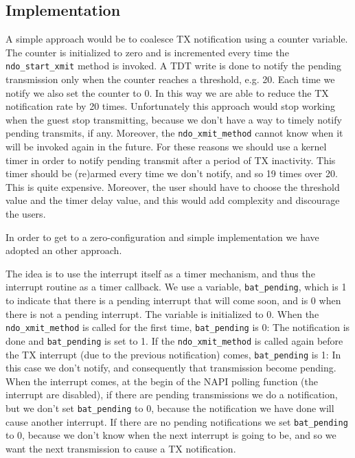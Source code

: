\subsection{Implementation}
A simple approach would be to coalesce TX notification using a counter variable. The counter is initialized to zero and is incremented 
every time the \texttt{ndo\_start\_xmit} method is invoked. A TDT write is done to notify the pending transmission only when the counter 
reaches a threshold, e.g. 20. Each time we notify we also set the counter to 0.
In this way we are able to reduce the TX notification rate by 20 times.
Unfortunately this approach would stop working when the guest stop transmitting, because we don't have a way to timely notify pending 
transmits, if any. Moreover, the \texttt{ndo\_xmit\_method} cannot know when it will be invoked again in the future. 
For these reasons we should use a kernel timer in order to notify pending transmit after a period of TX inactivity. This timer should be
(re)armed every time we don't notify, and so 19 times over 20. This is quite expensive.
Moreover, the user should have to choose the threshold value and the timer delay value, and this would add complexity and discourage the
users.

In order to get to a zero-configuration and simple implementation we have adopted an other approach.

\vspace{0.5cm}

The idea is to use the interrupt itself as a timer mechanism, and thus the interrupt routine as a timer callback.
We use a variable, \texttt{bat\_pending}, which is 1 to indicate that there is a pending interrupt that will come soon, and is
0 when there is not a pending interrupt. The variable is initialized to 0.
When the \texttt{ndo\_xmit\_method} is called for the first time, \texttt{bat\_pending} is 0: The notification is done and 
\texttt{bat\_pending} is set to 1.
If the \texttt{ndo\_xmit\_method} is called again before the TX interrupt (due to the previous notification) comes, \texttt{bat\_pending}
is 1: In this case we don't notify, and consequently that transmission become pending.
When the interrupt comes, at the begin of the NAPI polling function (the interrupt are disabled), if there are pending transmissions we do 
a notification, but we don't set \texttt{bat\_pending} to 0, because the notification we have done will cause another interrupt.
If there are no pending notifications we set \texttt{bat\_pending} to 0, because we don't know when the next interrupt is going to be, and
so we want the next transmission to cause a TX notification.

